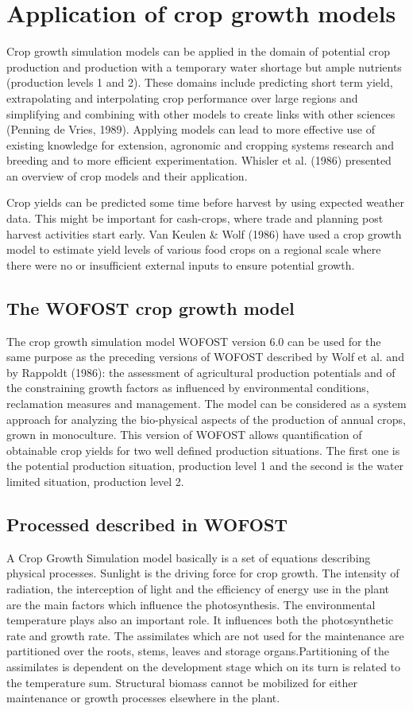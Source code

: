 \section{Application of crop growth models}
Crop growth simulation models can be applied in the domain of potential crop
production and production with a temporary water shortage but ample nutrients
(production levels 1 and 2). These domains include predicting short term yield,
extrapolating and interpolating crop performance over large regions and simplifying
and combining with other models to create links with other sciences (Penning de
Vries, 1989). Applying models can lead to more effective use of existing knowledge
for extension, agronomic and cropping systems research and breeding and to more
efficient experimentation. Whisler et al. (1986) presented an overview of crop models
and their application.

Crop yields can be predicted some time before harvest by using expected weather
data. This might be important for cash-crops, where trade and planning post harvest
activities start early.
Van Keulen \& Wolf (1986) have used a crop growth model to estimate yield levels of
various food crops on a regional scale where there were no or insufficient external
inputs to ensure potential growth.

\subsection{The WOFOST crop growth model}
The crop growth simulation model WOFOST version 6.0 can be used for the same
purpose as the preceding versions of WOFOST described by Wolf et al. and by
Rappoldt (1986): the assessment of agricultural production potentials and of the
constraining growth factors as influenced by environmental conditions, reclamation
measures and management. The model can be considered as a system approach for
analyzing the bio-physical aspects of the production of annual crops, grown in
monoculture. This version of WOFOST allows quantification of obtainable crop
yields for two well defined production situations. The first one is the potential
production situation, production level 1 and the second is the water limited situation,
production level 2.

\subsection{Processed described in WOFOST}
A Crop Growth Simulation model basically is a set of equations describing physical
processes. Sunlight is the driving force for crop growth. The intensity of radiation, the
interception of light and the efficiency of energy use in the plant are the main factors
which influence the photosynthesis. The environmental temperature plays also an
important role. It influences both the photosynthetic rate and growth rate. The
assimilates which are not used for the maintenance are partitioned over the roots,
stems, leaves and storage organs.Partitioning of the assimilates is dependent on the
development stage which on its turn is related to the temperature sum. Structural
biomass cannot be mobilized for either maintenance or growth processes elsewhere in
the plant.

